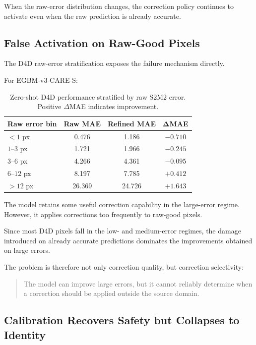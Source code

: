 \documentclass[11pt,a4paper]{article}
\begin{document}
When the raw-error distribution changes, the correction policy continues to
activate even when the raw prediction is already accurate.

\subsection{False Activation on Raw-Good Pixels}

The D4D raw-error stratification exposes the failure mechanism directly.

For EGBM-v3-CARE-S:

\begin{table}[h]
\centering
\caption{Zero-shot D4D performance stratified by raw S2M2 error.
Positive $\Delta$MAE indicates improvement.}
\small
\begin{tabular}{lccc}
\toprule
\textbf{Raw error bin}
& \textbf{Raw MAE}
& \textbf{Refined MAE}
& $\boldsymbol{\Delta}$\textbf{MAE} \\
\midrule
$<1$ px
& 0.476
& 1.186
& $-0.710$ \\

$1$--$3$ px
& 1.721
& 1.966
& $-0.245$ \\

$3$--$6$ px
& 4.266
& 4.361
& $-0.095$ \\

$6$--$12$ px
& 8.197
& 7.785
& $+0.412$ \\

$>12$ px
& 26.369
& 24.726
& $+1.643$ \\
\bottomrule
\end{tabular}
\end{table}

The model retains some useful correction capability in the large-error regime.
However, it applies corrections too frequently to raw-good pixels.

Since most D4D pixels fall in the low- and medium-error regimes, the damage
introduced on already accurate predictions dominates the improvements obtained on
large errors.

The problem is therefore not only correction quality, but correction selectivity:

\begin{quote}
The model can improve large errors, but it cannot reliably determine when a
correction should be applied outside the source domain.
\end{quote}

\subsection{Calibration Recovers Safety but Collapses to Identity}
\end{document}
